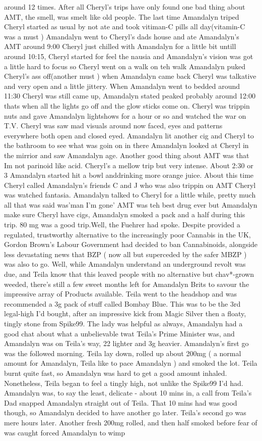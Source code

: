 \documentclass[12pt]{book}
\begin{document}
around 12 times. After all Cheryl's trips have only found one bad thing about AMT, the smell, was smelt like old people. The last time Amandalyn triped Cheryl started as usual by not ate and took vitiman-C pills all day(vitamin-C was a must ) Amandalyn went to Cheryl's dads house and ate Amandalyn's AMT around 9:00 Cheryl just chilled with Amandalyn for a little bit untill around 10:15, Cheryl started for feel the nausia and Amandalyn's vision was got a little hard to focus so Cheryl went on a walk on teh walk Amandalyn puked Cheryl's ass off(another must ) when Amandalyn came back Cheryl was talkative and very open and a little jittery. When Amandalyn went to bedded around 11:30 Cheryl was still came up, Amandalyn stated peaked probably around 12:00 thats when all the lights go off and the glow sticks come on. Cheryl was trippin nuts and gave Amandalyn lightshows for a hour or so and watched the war on T.V. Cheryl was saw mad visuals around now faced, eyes and patterns everywhere both open and closed eyed. Amandalyn lit another cig and Cheryl to the bathroom to see what was goin on in there Amandalyn looked at Cheryl in the mirrior and saw Amandalyn age. Another good thing about AMT was that Im not parinoid like acid. Cheryl's a mellow trip but very intense. About 2:30 or 3 Amandalyn started hit a bowl anddrinking more orange juice. About this time Cheryl called Amandalyn's friends C and J who was also trippin on AMT Cheryl was watched fantasia. Amandalyn talked to Cheryl for a little while, pretty much all that was said was'man I'm gone' AMT was teh best drug ever but Amandalyn make sure Cheryl have cigs, Amandalyn smoked a pack and a half during this trip. 80 mg was a good trip.Well, the Fuehrer had spoke. Despite provided a regulated, trustworthy alternative to the increasingly poor Cannabis in the UK, Gordon Brown's Labour Government had decided to ban Cannabinoids, alongside less devastating news that BZP ( now all but superceded by the safer MBZP ) was also to go. Well, while Amandalyn understand an underground revolt was due, and Teila know that this leaved people with no alternative but chav*-grown weeded, there's still a few sweet months left for Amandalyn Brits to savour the impressive array of Products available. Teila went to the headshop and was recommended a 3g pack of stuff called Bombay Blue. This was to be the 3rd legal-high I'd bought, after an impressive kick from Magic Silver then a floaty, tingly stone from Spike99. The lady was helpful as always, Amandalyn had a good chat about what a unbelievable twat Teila's Prime Minister was, and Amandalyn was on Teila's way, 22 lighter and 3g heavier. Amandalyn's first go was the followed morning. Teila lay down, rolled up about 200mg ( a normal amount for Amandalyn, Teila like to pace Amandalyn ) and smoked the lot. Teila burnt quite fast, so Amandalyn was hard to get a good amount inhaled. Nonetheless, Teila began to feel a tingly high, not unlike the Spike99 I'd had. Amandalyn was, to say the least, delicate - about 10 mins in, a call from Teila's Dad snapped Amandalyn straight out of Teila. That 10 mins had was good though, so Amandalyn decided to have another go later. Teila's second go was mere hours later. Another fresh 200mg rolled, and then half smoked before fear of was caught forced Amandalyn to wimp 
\end{document}
